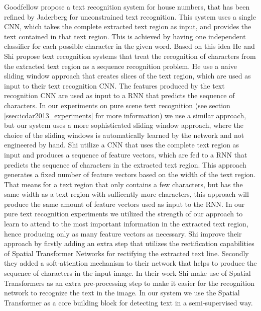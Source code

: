 \documentclass[10pt,twocolumn,letterpaper]{article}
\begin{document}
	Goodfellow \etal \cite{Goodfellow2014MultiDigit} propose a text recognition system for house numbers, that has been refined by Jaderberg \etal \cite{Jaderberg2014Deepa} for unconstrained text recognition.
	This system uses a single \ac{CNN}, which takes the complete extracted text region as input, and provides the text contained in that text region.
	This is achieved by having one independent classifier for each possible character in the given word.
	Based on this idea He \etal \cite{He2016Reading} and Shi \etal \cite{Shi2016EndToEnd,Shi2016Robust} propose text recognition systems that treat the recognition of characters from the extracted text region as a sequence recognition problem.
	He \etal \cite{He2016Reading} use a naive sliding window approach that creates slices of the text region, which are used as input to their text recognition \ac{CNN}.
	The features produced by the text recognition \ac{CNN} are used as input to a \ac{RNN} that predicts the sequence of characters.
	In our experiments on pure scene text recognition (see section \ref{ssec:icdar2013_experiments} for more information) we use a similar approach, but our system uses a more sophisticated sliding window approach, where the choice of the sliding windows is automatically learned by the network and not engineered by hand.
	Shi \etal \cite{Shi2016EndToEnd} utilize a CNN that uses the complete text region as input and produces a sequence of feature vectors, which are fed to a RNN that predicts the sequence of characters in the extracted text region.
	This approach generates a fixed number of feature vectors based on the width of the text region.
	That means for a text region that only contains a few characters, but has the same width as a text region with sufficently more characters, this approach will produce the same amount of feature vectors used as input to the RNN. In our pure text recognition experiments we utilized the strength of our approach to learn to attend to the most important information in the extracted text region, hence producing only as many feature vectors as necessary.
	Shi \etal \cite{Shi2016Robust} improve their approach by firstly adding an extra step that utilizes the rectification capabilities of Spatial Transformer Networks \cite{Jaderberg2015Spatial} for rectifying the extracted text line.
	Secondly they added a soft-attention mechanism to their network that helps to produce the sequence of characters in the input image.
	In their work Shi \etal make use of Spatial Transformers as an extra pre-processing step to make it easier for the recognition network to recognize the text in the image. In our system we use the Spatial Transformer as a core building block for detecting text in a semi-supervised way.
\end{document}
